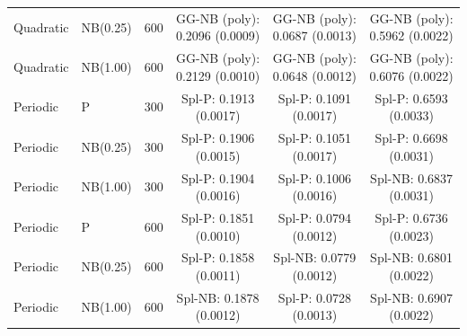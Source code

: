 \begin{table}[tbp]
{\begin{tabular}{lllccc}
Quadratic & NB(0.25) & 600 & GG-NB (poly): 0.2096 (0.0009) & GG-NB (poly): 0.0687 (0.0013) & GG-NB (poly): 0.5962 (0.0022) \\
Quadratic & NB(1.00) & 600 & GG-NB (poly): 0.2129 (0.0010) & GG-NB (poly): 0.0648 (0.0012) & GG-NB (poly): 0.6076 (0.0022) \\
\hline
Periodic & P & 300 & Spl-P: 0.1913 (0.0017) & Spl-P: 0.1091 (0.0017) & Spl-P: 0.6593 (0.0033) \\
Periodic & NB(0.25) & 300 & Spl-P: 0.1906 (0.0015) & Spl-P: 0.1051 (0.0017) & Spl-P: 0.6698 (0.0031) \\
Periodic & NB(1.00) & 300 & Spl-P: 0.1904 (0.0016) & Spl-P: 0.1006 (0.0016) & Spl-NB: 0.6837 (0.0031) \\
Periodic & P & 600 & Spl-P: 0.1851 (0.0010) & Spl-P: 0.0794 (0.0012) & Spl-P: 0.6736 (0.0023) \\
Periodic & NB(0.25) & 600 & Spl-P: 0.1858 (0.0011) & Spl-NB: 0.0779 (0.0012) & Spl-NB: 0.6801 (0.0022) \\
Periodic & NB(1.00) & 600 & Spl-NB: 0.1878 (0.0012) & Spl-P: 0.0728 (0.0013) & Spl-NB: 0.6907 (0.0022) \\
\hline
\end{tabular}%
}
\end{table}
